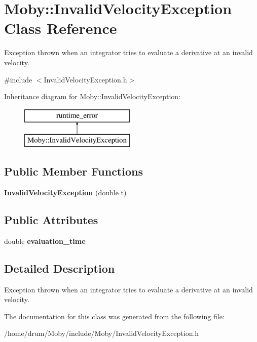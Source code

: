 \section{Moby\-:\-:Invalid\-Velocity\-Exception Class Reference}
\label{classMoby_1_1InvalidVelocityException}


Exception thrown when an integrator tries to evaluate a derivative at an invalid velocity.  




{\ttfamily \#include $<$Invalid\-Velocity\-Exception.\-h$>$}

Inheritance diagram for Moby\-:\-:Invalid\-Velocity\-Exception\-:\begin{figure}[H]
\begin{center}
\leavevmode
\includegraphics[height=2.000000cm]{classMoby_1_1InvalidVelocityException}
\end{center}
\end{figure}
\subsection*{Public Member Functions}
\begin{DoxyCompactItemize}
\item 
{\bfseries Invalid\-Velocity\-Exception} (double t)\label{classMoby_1_1InvalidVelocityException_ac1fd7df3c0891e04b2292ee51c119163}

\end{DoxyCompactItemize}
\subsection*{Public Attributes}
\begin{DoxyCompactItemize}
\item 
double {\bfseries evaluation\-\_\-time}\label{classMoby_1_1InvalidVelocityException_a414ec52bc7893290faa3595d1c9a7518}

\end{DoxyCompactItemize}


\subsection{Detailed Description}
Exception thrown when an integrator tries to evaluate a derivative at an invalid velocity. 

The documentation for this class was generated from the following file\-:\begin{DoxyCompactItemize}
\item 
/home/drum/\-Moby/include/\-Moby/Invalid\-Velocity\-Exception.\-h\end{DoxyCompactItemize}
